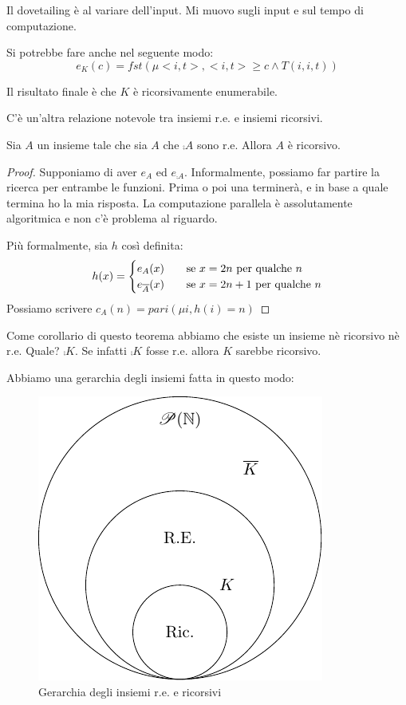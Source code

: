 Il dovetailing è al variare dell'input. Mi muovo sugli input e sul tempo di computazione.

Si potrebbe fare anche nel seguente modo:
\begin{equation*}
    e_{K}(c) = fst(\mu <i,t>, <i,t> \geq c \land T(i,i,t))
\end{equation*}

Il risultato finale è che $K$ è ricorsivamente enumerabile.

C'è un'altra relazione notevole tra insiemi r.e. e insiemi ricorsivi.

\begin{thm}
    Sia $A$ un insieme tale che sia $A$ che $\comp{A}$ sono r.e. Allora $A$ è ricorsivo.
\end{thm}
\begin{proof}
    Supponiamo di aver $e_{A}$ ed $e_{\comp{A}}$. Informalmente, possiamo far partire la ricerca per
    entrambe le funzioni. Prima o poi una terminerà, e in base a quale termina ho la mia risposta. La
    computazione parallela è assolutamente algoritmica e non c'è problema al riguardo.

    Più formalmente, sia $h$ così definita:
    \begin{equation*}
        h(x) =
        \begin{cases}
            e_{A}(x) \quad &\text{se $x = 2n$ per qualche $n$} \\
            e_{\overline{A}}(x) \quad &\text{se $x = 2n+1$ per qualche $n$} \\
        \end{cases}
    \end{equation*}
    Possiamo scrivere $c_{A}(n) = \textit{pari}(\mu i, h(i) = n)$
\end{proof}

Come corollario di questo teorema abbiamo che esiste un insieme nè ricorsivo nè r.e. Quale?
$\comp{K}$. Se infatti $\comp{K}$ fosse r.e. allora $K$ sarebbe ricorsivo.

Abbiamo una gerarchia degli insiemi fatta in questo modo: 

\begin{figure}[h]
    \centering
    \includegraphics{./img/recursivesets/RecursiveHierarchy.pdf}
    \caption{Gerarchia degli insiemi r.e. e ricorsivi}
\end{figure}

